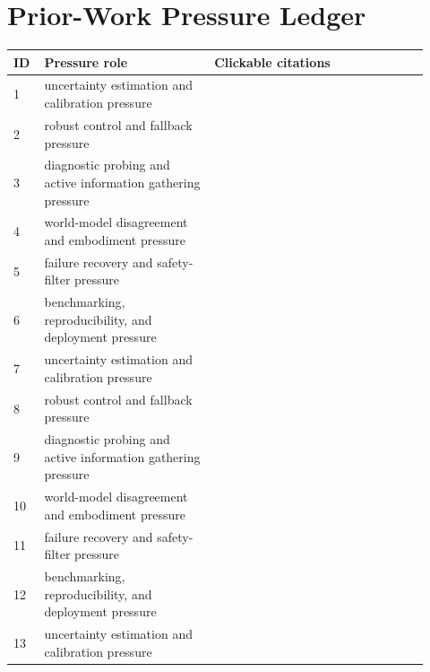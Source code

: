 \documentclass[11pt]{article}
\begin{document}
\section{Prior-Work Pressure Ledger}
\label{app:citations}
\small
\begin{longtable}{p{0.06\linewidth}p{0.38\linewidth}p{0.48\linewidth}}
\toprule
ID & Pressure role & Clickable citations \\
\midrule
1 & uncertainty estimation and calibration pressure & \citep{hekler2016agile1,wang2022improved2,giubilini2025expertise3} \\
2 & robust control and fallback pressure & \citep{viereck2017learning4,viereck2017learning5,sun2024learning6} \\
3 & diagnostic probing and active information gathering pressure & \citep{wang2026world7,sun2026maniparena8,grooten2023automatic9} \\
4 & world-model disagreement and embodiment pressure & \citep{wei2021heterogeneouspake10,radosavovic2024realworld11,ref2026benchmarking12} \\
5 & failure recovery and safety-filter pressure & \citep{greenbaum2020making13,wang2021real14,choudhary2023humanai15} \\
6 & benchmarking, reproducibility, and deployment pressure & \citep{malandrino2023unexpectedly16,miuccio2024on17,friston2021world18} \\
7 & uncertainty estimation and calibration pressure & \citep{tsekhmystro2019mobile19,hu2022remaining20,zeiger2009mobile21} \\
8 & robust control and fallback pressure & \citep{andrews2021insights22,tsiklaurindevaluating23,gugulothu2020predicting24} \\
9 & diagnostic probing and active information gathering pressure & \citep{ting2021on25,goulao2024training26,yu2024remaining27} \\
10 & world-model disagreement and embodiment pressure & \citep{cash2020salience28,ozsundbuilding29,chukwurah2024simtoreal30} \\
11 & failure recovery and safety-filter pressure & \citep{yang2026a31,zhang2024rpointnet32,viereck2017learning33} \\
12 & benchmarking, reproducibility, and deployment pressure & \citep{pamecha1997useful34,ali2019methods35,zhao2022marfusion36} \\
13 & uncertainty estimation and calibration pressure & \citep{takita2015special37,luo2022extracting38,rietveld2022changeability39} \\

\end{longtable}
\end{document}
